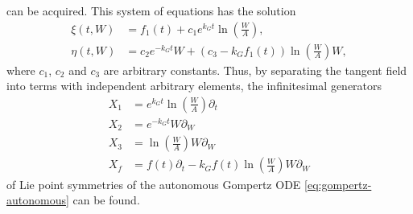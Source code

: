 can be acquired.
This system of equations has the solution
\begin{align}
  \xi(t, W) &= f_1(t) + c_1 e^{k_G t} \ln(\frac{W}{A}),\\
  \eta(t, W) &= c_2 e^{-k_G t} W + \left( c_3 - k_G f_1(t) \right) \ln(\frac{W}{A}) W,
\end{align}
where \(c_1\), \(c_2\) and \(c_3\) are arbitrary constants.
Thus, by separating the tangent field into terms with independent arbitrary elements, the infinitesimal generators
\begin{align}
  X_1 &= e^{k_G t} \ln(\frac{W}{A}) \partial_t \\
  X_2 &= e^{-k_G t} W \partial_W \\
  X_3 &= \ln(\frac{W}{A}) W \partial_W \\
  X_f &= f(t) \partial_t - k_G f(t) \ln(\frac{W}{A}) W \partial_W
\end{align}
of Lie point symmetries of the autonomous Gompertz ODE \ref{eq:gompertz-autonomous} can be found.

